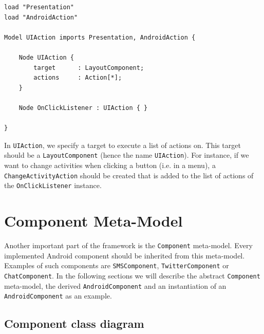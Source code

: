\begin{lstlisting}[label=uiaction-mm,caption=UIAction meta-model, captionpos=t]
load "Presentation"
load "AndroidAction"

Model UIAction imports Presentation, AndroidAction {
	
	Node UIAction {
		target 		: LayoutComponent;
		actions 	: Action[*];
	}

	Node OnClickListener : UIAction { }

}
\end{lstlisting}
In \texttt{UIAction}, we specify a target to execute a list of actions on. This target should be a \texttt{LayoutComponent} (hence the name \texttt{UIAction}). For instance, if we want to change activities when clicking a button (i.e. in a menu), a \texttt{ChangeActivityAction} should be created that is added to the list of actions of the \texttt{OnClickListener} instance.

\section{Component Meta-Model}

Another important part of the framework is the \texttt{Component} meta-model. Every implemented Android component should be inherited from this meta-model. Examples of such components are \texttt{SMSComponent}, \texttt{TwitterComponent} or \texttt{ChatComponent}. In the following sections we will describe the abstract \texttt{Component} meta-model, the derived \texttt{AndroidComponent} and an instantiation of an \texttt{AndroidComponent} as an example.

\subsection{Component class diagram}

